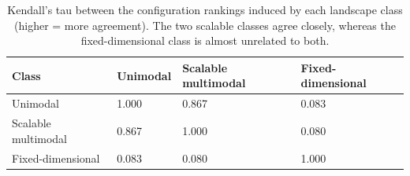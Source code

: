 \begin{table}[h]
\centering
\caption{Kendall's tau between the configuration rankings induced by each landscape class (higher = more agreement). The two scalable classes agree closely, whereas the fixed-dimensional class is almost unrelated to both.}
\label{tab:kendall_class}
\begin{tabular}{llll}
\toprule
Class & Unimodal & Scalable multimodal & Fixed-dimensional \\
\midrule
Unimodal & 1.000 & 0.867 & 0.083 \\
Scalable multimodal & 0.867 & 1.000 & 0.080 \\
Fixed-dimensional & 0.083 & 0.080 & 1.000 \\
\bottomrule
\end{tabular}
\end{table}
